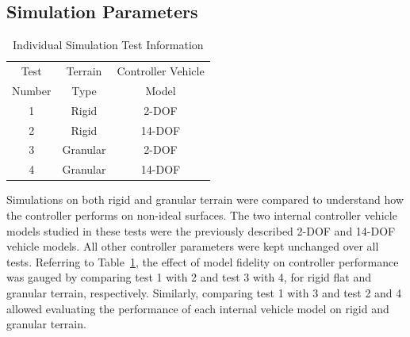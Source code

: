 \documentclass[12pt,onecolumn]{article}
\begin{document}

\subsection{Simulation Parameters}\label{ss:SimParameters}

\begin{table}
\begin{center}
	\begin{tabular}{||c |c | c||} 
		\hline
		Test  & Terrain  & Controller Vehicle \\
		Number &  Type & Model\\ [0.5ex] 	
		\hline\hline
		1 & Rigid & 2-DOF \\ 
		\hline
		2 & Rigid & 14-DOF \\
		\hline
		3 & Granular & 2-DOF \\
		\hline
		4 & Granular & 14-DOF \\
		\hline
	\end{tabular}
\end{center}
\caption{Individual Simulation Test Information}
\label{t:TestMatrix}
\end{table}

Simulations on both rigid and granular terrain were compared to understand how the controller performs on non-ideal surfaces.  The two internal controller vehicle models studied in these tests were the previously described 2-DOF and 14-DOF vehicle models. All other controller parameters were kept unchanged over all tests. Referring to Table~\ref{t:TestMatrix}, the effect of model fidelity on controller performance was gauged by comparing test 1 with 2 and test 3 with 4, for rigid flat and granular terrain, respectively.
Similarly, comparing test 1 with 3 and test 2 and 4 allowed evaluating the performance of each internal vehicle model on rigid and granular terrain.
\end{document}
